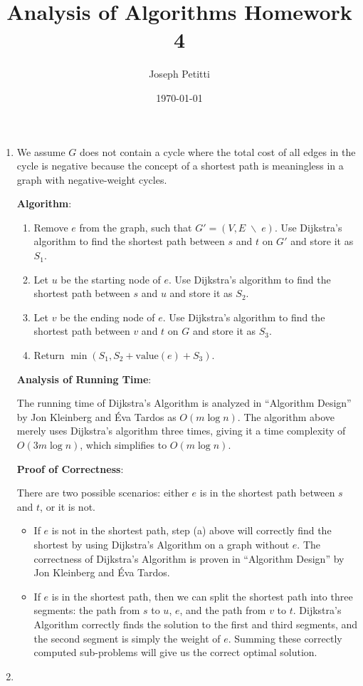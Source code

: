 \documentclass[a4paper, 10pt]{article}
\title{Analysis of Algorithms Homework 4}
\author{Joseph Petitti}
\date{\today}
\begin{document}
\maketitle

\begin{enumerate}
	\item 
		We assume $G$ does not contain a cycle where the total cost of all edges
		in the cycle is negative because the concept of a shortest path is
		meaningless in a graph with negative-weight cycles.

		\textbf{Algorithm}:

		\begin{enumerate}
			\item Remove $e$ from the graph, such that $G' = (V, E \; \backslash
				\; e)$. Use Dijkstra's algorithm to find the shortest path
				between $s$ and $t$ on $G'$ and store it as $S_1$.
			\item Let $u$ be the starting node of $e$. Use Dijkstra's algorithm
				to find the shortest path between $s$ and $u$ and store it as
				$S_2$.
			\item Let $v$ be the ending node of $e$. Use Dijkstra's algorithm to
				find the shortest path between $v$ and $t$ on $G$ and store it
				as $S_3$.
			\item Return $\min ( S_1, S_2 + \textrm{value}(e) + S_3 )$.
		\end{enumerate}

		\textbf{Analysis of Running Time}:

		The running time of Dijkstra's Algorithm is analyzed in ``Algorithm
		Design'' by Jon Kleinberg and Éva Tardos as $O(m \log n)$. The algorithm
		above merely uses Dijkstra's algorithm three times, giving it a time
		complexity of $O(3m \log n)$, which simplifies to $O(m \log n)$.

		\textbf{Proof of Correctness}:

		There are two possible scenarios: either $e$ is in the shortest path
		between $s$ and $t$, or it is not.

		\begin{itemize}
			\item If $e$ is not in the shortest path, step (a) above will
				correctly find the shortest by using Dijkstra's Algorithm on a
				graph without $e$. The correctness of Dijkstra's Algorithm is
				proven in ``Algorithm Design'' by Jon Kleinberg and Éva Tardos.
			\item If $e$ is in the shortest path, then we can split the shortest
				path into three segments: the path from $s$ to $u$, $e$, and the
				path from $v$ to $t$. Dijkstra's Algorithm correctly finds the
				solution to the first and third segments, and the second segment
				is simply the weight of $e$. Summing these correctly computed
				sub-problems will give us the correct optimal solution.
		\end{itemize}

	\item
\end{enumerate}
\end{document}
